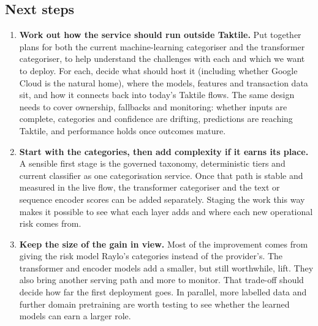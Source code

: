 \subsection{Next steps}
\begin{enumerate}
\item \textbf{Work out how the service should run outside Taktile.} Put together plans for both the current machine-learning categoriser and the transformer categoriser, to help understand the challenges with each and which we want to deploy. For each, decide what should host it (including whether Google Cloud is the natural home), where the models, features and transaction data sit, and how it connects back into today's Taktile flows. The same design needs to cover ownership, fallbacks and monitoring: whether inputs are complete, categories and confidence are drifting, predictions are reaching Taktile, and performance holds once outcomes mature.
\item \textbf{Start with the categories, then add complexity if it earns its place.} A sensible first stage is the governed taxonomy, deterministic tiers and current classifier as one categorisation service. Once that path is stable and measured in the live flow, the transformer categoriser and the text or sequence encoder scores can be added separately. Staging the work this way makes it possible to see what each layer adds and where each new operational risk comes from.
\item \textbf{Keep the size of the gain in view.} Most of the improvement comes from giving the risk model Raylo's categories instead of the provider's. The transformer and encoder models add a smaller, but still worthwhile, lift. They also bring another serving path and more to monitor. That trade-off should decide how far the first deployment goes. In parallel, more labelled data and further domain pretraining are worth testing to see whether the learned models can earn a larger role.
\end{enumerate}
